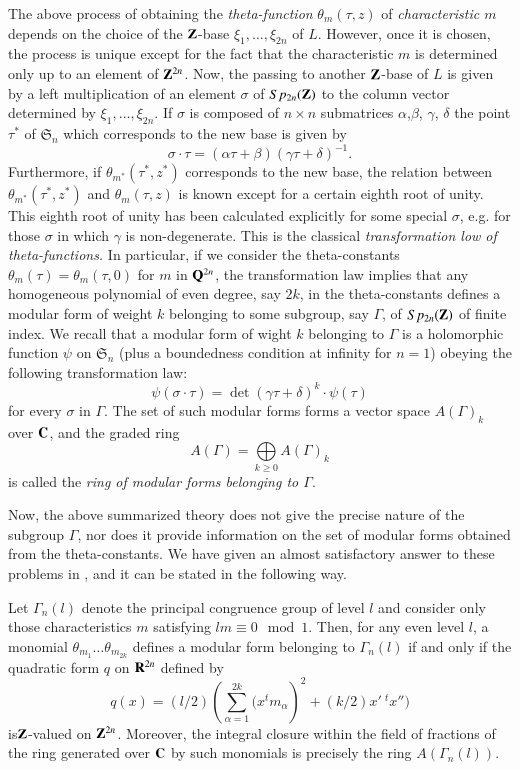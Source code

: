 The above process of obtaining the {\em theta-function} $\theta_{m}(\tau,z)$ of {\em characteristic $m$} depends on the choice of the $\mathbf{Z}$-base $\xi_{1},\ldots,\xi_{2n}$ of $L$. However, once it is chosen, the process is unique except for the fact that the characteristic $m$ is determined only up to an element of $\mathbf{Z}^{2n}$. Now, the passing to another $\mathbf{Z}$-base of $L$ is given by a left multiplication of an element $\sigma$ of $Sp_{2n}(\mathbf{Z})$ to the column vector determined by $\xi_{1},\ldots,\xi_{2n}$. If $\sigma$ is composed of $n\times n$ submatrices $\alpha$,\pageoriginale $\beta$, $\gamma$, $\delta$ the point $\tau^{*}$ of $\mathfrak{S}_{n}$ which corresponds to the new base is given by
$$
\sigma\cdot \tau=(\alpha \tau+\beta)(\gamma\tau+\delta)^{-1}.
$$
Furthermore, if $\theta_{m^{*}}(\tau^{*},z^{*})$ corresponds to the new base, the relation between $\theta_{m^{*}}(\tau^{*},z^{*})$ and $\theta_{m}(\tau,z)$ is known except for a certain eighth root of unity. This eighth root of unity has been calculated explicitly for some special $\sigma$, e.g. for those $\sigma$ in which $\gamma$ is non-degenerate. This is the classical {\em transformation low of theta-functions.} In particular, if we consider the theta-constants $\theta_{m}(\tau)=\theta_{m}(\tau,0)$ for $m$ in $\mathbf{Q}^{2n}$, the transformation law implies that any homogeneous polynomial of even degree, say $2k$, in the theta-constants defines a modular form of weight $k$ belonging to some subgroup, say $\Gamma$, of $Sp_{2n}(\mathbf{Z})$ of finite index. We recall that a modular form of wight $k$ belonging to $\Gamma$ is a holomorphic function $\psi$ on $\mathfrak{S}_{n}$ (plus a boundedness condition at infinity for $n=1$) obeying the following transformation law:
$$
\psi(\sigma\cdot \tau)=\det (\gamma\tau+\delta)^{k}\cdot \psi(\tau)
$$
for every $\sigma$ in $\Gamma$. The set of such modular forms forms a vector space $A(\Gamma)_{k}$ over $\mathbf{C}$, and the graded ring
$$
A(\Gamma)=\bigoplus\limits_{k\geq 0}A(\Gamma)_{k}
$$
is called the {\em ring of modular forms belonging to $\Gamma$}.

Now, the above summarized theory does not give the precise nature of the subgroup $\Gamma$, nor does it provide information on the set of modular forms obtained from the theta-constants. We have given an almost satisfactory answer to these problems in \cite{art12-key9}, and it can be stated in the following way.

Let $\Gamma_{n}(l)$ denote the principal congruence group of level $l$ and consider only those characteristics $m$ satisfying $lm\equiv 0\mod 1$. Then, for any even level $l$, a monomial $\theta_{m_{1}}\ldots \theta_{m_{2k}}$ defines a modular form belonging to $\Gamma_{n}(l)$ if and only if the quadratic form $q$ on $\mathbf{R}^{2n}$ defined by
$$
q(x)=(l/2)\left(\sum\limits^{2k}_{\alpha=1}(x^{t}m_{\alpha}\right)^{2}+(k/2)x' \ {}^{t}x'')
$$
is\pageoriginale $\mathbf{Z}$-valued on $\mathbf{Z}^{2n}$. Moreover, the integral closure within the field of fractions of the ring generated over $\mathbf{C}$ by such monomials is precisely the ring $A(\Gamma_{n}(l))$.

